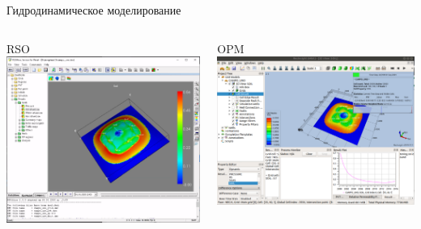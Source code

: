 \begin{frame}{Гидродинамическое моделирование}
\begin{columns}
    \begin{center}
        RSO
        \newline
        \includegraphics[scale=0.2]{fig/RSO.png}
    \end{center}
    \begin{center}
        OPM
        \newline
        \includegraphics[scale=0.18]{fig/OPM.png}
    \end{center}
\end{columns}
\end{frame}